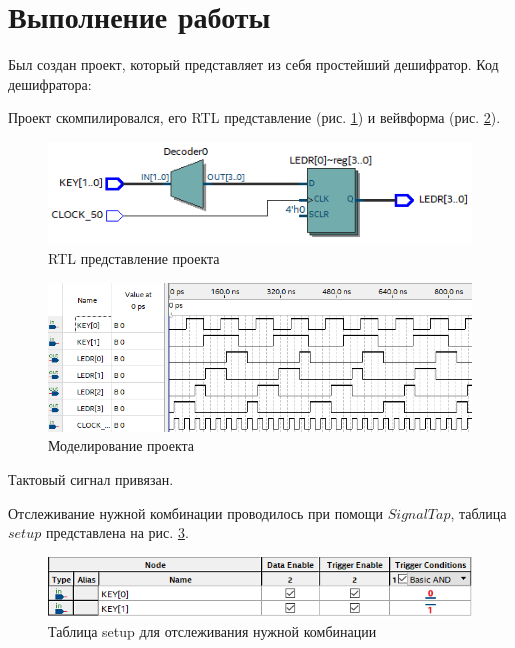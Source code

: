 \documentclass[a4paper,14pt]{article}
\begin{document}
	
	\section{Выполнение работы}
	
	Был создан проект, который представляет из себя простейший дешифратор.
	Код дешифратора:
	
	{\small {}}
	
	Проект скомпилировался, его RTL представление (рис. \ref{fig:rtl}) и вейвформа (рис. \ref{fig:wvf}).
	
	\begin{figure}[H]
		\centering
		\includegraphics[width=0.6\linewidth]{images/RTL}
		\caption{RTL представление проекта}
		\label{fig:rtl}
	\end{figure}

	\begin{figure}[H]
		\centering
		\includegraphics[width=0.6\linewidth]{images/WVF}
		\caption{Моделирование проекта}
		\label{fig:wvf}
	\end{figure}
	
	Тактовый сигнал привязан.
	
	Отслеживание нужной комбинации проводилось при помощи $SignalTap$, таблица $setup$ представлена на рис. \ref{fig:setupkey1}.
	
	\begin{figure}[H]
		\centering
		\includegraphics[width=0.7\linewidth]{images/setup_key_1}
		\caption{Таблица setup для отслеживания нужной комбинации}
		\label{fig:setupkey1}
	\end{figure}
\end{document}
